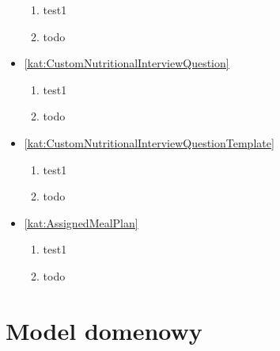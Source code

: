 \begin{itemize}[label={\textbf{Ograniczenia dla}}, wide, labelwidth=!, labelindent=0pt]
\begin{enumerate}[label={\textbf{OGR/\protect\threedigits{\arabic{enumi}}}}, wide, labelwidth=!, align=left, leftmargin=3cm, resume]
        \item test1

        \item todo
    \end{enumerate}
    \item\ref{kat:CustomNutritionalInterviewQuestion}
    \begin{enumerate}[label={\textbf{OGR/\protect\threedigits{\arabic{enumi}}}}, wide, labelwidth=!, align=left, leftmargin=3cm, resume]

        \item test1

        \item todo
    \end{enumerate}
    \item\ref{kat:CustomNutritionalInterviewQuestionTemplate}
    \begin{enumerate}[label={\textbf{OGR/\protect\threedigits{\arabic{enumi}}}}, wide, labelwidth=!, align=left, leftmargin=3cm, resume]

        \item test1

        \item todo
    \end{enumerate}
    \item\ref{kat:AssignedMealPlan}
    \begin{enumerate}[label={\textbf{OGR/\protect\threedigits{\arabic{enumi}}}}, wide, labelwidth=!, align=left, leftmargin=3cm, resume]

        \item test1

        \item todo
    \end{enumerate}
\end{itemize}

\section{Model domenowy}\label{sec:domainModel}

